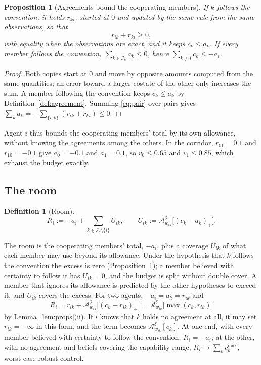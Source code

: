 \documentclass[11pt]{article}
\newtheorem{proposition}[theorem]{Proposition}
\theoremstyle{definition}
\newtheorem{definition}[theorem]{Definition}
\theoremstyle{remark}
\newcommand{\A}{\mathcal{A}}
\newcommand{\I}{\mathcal{I}}
\begin{document}
\begin{proposition}[Agreements bound the cooperating members]\label{prop:agree}
If $k$ follows the convention, it holds $r_{ki}$, started at $0$ and updated by the same rule from the same observations, so that
\begin{equation}\label{eq:pair}
r_{ik}+r_{ki}\ge0,
\end{equation}
with equality when the observations are exact, and it keeps $c_k\le a_k$. If every member follows the convention, $\sum_{k\in\I_c}a_k\le0$, hence $\sum_{k\ne i}c_k\le-a_i$.
\end{proposition}
\begin{proof}
Both copies start at $0$ and move by opposite amounts computed from the same quantities; an error toward a larger costate of the other only increases the sum. A member following the convention keeps $c_k\le a_k$ by Definition~\ref{def:agreement}. Summing \eqref{eq:pair} over pairs gives $\sum_ka_k=-\sum_{\{i,k\}}(r_{ik}+r_{ki})\le0$.
\end{proof}

Agent $i$ thus bounds the cooperating members' total by its own allowance, without knowing the agreements among the others. In the corridor, $r_{01}=0.1$ and $r_{10}=-0.1$ give $a_0=-0.1$ and $a_1=0.1$, so $v_0\le0.65$ and $v_1\le0.85$, which exhaust the budget exactly.

\subsection{The room}
\begin{definition}[Room]\label{def:room}
\[
R_i:=-a_i+\sum_{k\in\I_c\setminus\{i\}}U_{ik},\qquad U_{ik}:=\A^\delta_{w_{ik}}\big[(c_k-a_k)_+\big].
\]
\end{definition}

The room is the cooperating members' total, $-a_i$, plus a coverage $U_{ik}$ of what each member may use beyond its allowance. Under the hypothesis that $k$ follows the convention the excess is zero (Proposition~\ref{prop:agree}); a member believed with certainty to follow it has $U_{ik}=0$, and the budget is split without double cover. A member that ignores its allowance is predicted by the other hypotheses to exceed it, and $U_{ik}$ covers the excess. For two agents, $-a_i=a_k=r_{ik}$ and
\[
R_i=r_{ik}+\A^\delta_{w_{ik}}\big[(c_k-r_{ik})_+\big]=\A^\delta_{w_{ik}}\big[\max(c_k,r_{ik})\big]
\]
by Lemma~\ref{lem:props}(ii). If $i$ knows that $k$ holds no agreement at all, it may set $r_{ik}=-\infty$ in this form, and the term becomes $\A^\delta_{w_{ik}}[c_k]$. At one end, with every member believed with certainty to follow the convention, $R_i=-a_i$; at the other, with no agreement and beliefs covering the capability range, $R_i\to\sum_kc_k^{\max}$, worst-case robust control.
\end{document}
